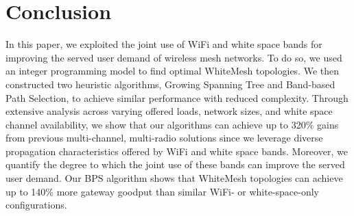 \section{Conclusion}
\label{sec:conclusion}
In this paper, we exploited the joint use of WiFi and white space bands for 
improving the served user demand of wireless mesh networks.  To do so, we
used an integer programming model to find optimal WhiteMesh topologies.  We
then constructed two heuristic algorithms, Growing Spanning Tree and Band-based
Path Selection, to achieve similar performance with reduced complexity. Through 
extensive analysis across varying offered loads, network sizes, and white space 
channel availability, we show that our algorithms can achieve up to 320\% gains 
from previous multi-channel, multi-radio solutions since we leverage diverse 
propagation characteristics offered by WiFi and white space bands.  Moreover,
we quantify the degree to which the joint use of these bands can improve the served
user demand. Our BPS algorithm shows that WhiteMesh topologies can achieve up to 
140\% more gateway goodput than similar WiFi- or white-space-only configurations.


